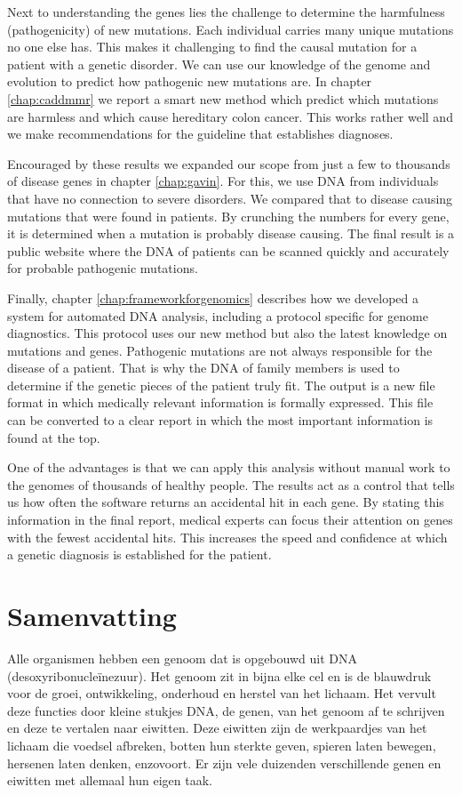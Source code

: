 \begin{appendices}
	Next to understanding the genes lies the challenge to determine the harmfulness (pathogenicity) of new mutations.
	Each individual carries many unique mutations no one else has.
	This makes it challenging to find the causal mutation for a patient with a genetic disorder.
	We can use our knowledge of the genome and evolution to predict how pathogenic new mutations are.
	In chapter \ref{chap:caddmmr} we report a smart new method which predict which mutations are harmless and which cause hereditary colon cancer.
	This works rather well and we make recommendations for the guideline that establishes diagnoses.
	
	Encouraged by these results we expanded our scope from just a few to thousands of disease genes in chapter \ref{chap:gavin}.
	For this, we use DNA from individuals that have no connection to severe disorders.
	We compared that to disease causing mutations that were found in patients.
	By crunching the numbers for every gene, it is determined when a mutation is probably disease causing.
	The final result is a public website where the DNA of patients can be scanned quickly and accurately for probable pathogenic mutations.
	
	Finally, chapter \ref{chap:frameworkforgenomics} describes how we developed a system for automated DNA analysis, including a protocol specific for genome diagnostics.
	This protocol uses our new method but also the latest knowledge on mutations and genes.
	Pathogenic mutations are not always responsible for the disease of a patient.
	That is why the DNA of family members is used to determine if the genetic pieces of the patient truly fit.
	The output is a new file format in which medically relevant information is formally expressed.
	This file can be converted to a clear report in which the most important information is found at the top.
	
	One of the advantages is that we can apply this analysis without manual work to the genomes of thousands of healthy people.
	The results act as a control that tells us how often the software returns an accidental hit in each gene.
	By stating this information in the final report, medical experts can focus their attention on genes with the fewest accidental hits.
	This increases the speed and confidence at which a genetic diagnosis is established for the patient.
	
	\chapter{Samenvatting}
	Alle organismen hebben een genoom dat is opgebouwd uit DNA (desoxyribonucleïnezuur).
	Het genoom zit in bijna elke cel en is de blauwdruk voor de groei, ontwikkeling, onderhoud en herstel van het lichaam.
	Het vervult deze functies door kleine stukjes DNA, de genen, van het genoom af te schrijven en deze te vertalen naar eiwitten.
	Deze eiwitten zijn de werkpaardjes van het lichaam die voedsel afbreken, botten hun sterkte geven, spieren laten bewegen, hersenen laten denken, enzovoort.
	Er zijn vele duizenden verschillende genen en eiwitten met allemaal hun eigen taak.
	

\end{appendices}
